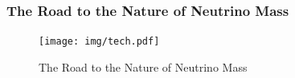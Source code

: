 \documentclass{beamer}
\begin{document}
\begin{frame}
    \frametitle{The Road to the Nature of Neutrino Mass}
    
    \begin{figure}[H]
        \centering
            \texttt{[image: img/tech.pdf]}
        \caption{The Road to the Nature of Neutrino Mass}
    \end{figure}
\end{frame}


\begin{frame}


\end{frame}
\end{document}
